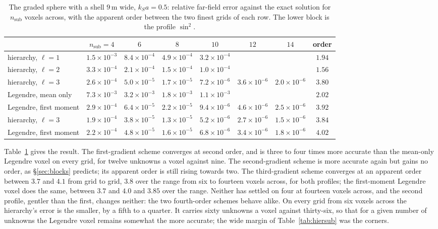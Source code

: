 \documentclass[11pt,a4paper]{article}
\begin{document}
\begin{table}[htbp]
\centering
\caption{The graded sphere with a shell $9$\,m wide, $k_Sa=0.5$: relative far-field error against the
exact solution for $n_{\mathrm{sub}}$ voxels across, with the apparent order between the two finest
grids of each row. The lower block is the profile $\sin^2$.}\label{tab:hiergraded}
\small\setlength{\tabcolsep}{4pt}
\begin{tabular}{@{}lccccccc@{}}
\toprule
 & $n_{\mathrm{sub}}=4$ & $6$ & $8$ & $10$ & $12$ & $14$ & order \\
\midrule
hierarchy, $\ell=1$ & $1.5\times10^{-3}$ & $8.4\times10^{-4}$ & $4.9\times10^{-4}$ & $3.2\times10^{-4}$ & & & $1.94$ \\
hierarchy, $\ell=2$ & $3.3\times10^{-4}$ & $2.1\times10^{-4}$ & $1.5\times10^{-4}$ & $1.0\times10^{-4}$ & & & $1.56$ \\
hierarchy, $\ell=3$ & $2.6\times10^{-4}$ & $5.0\times10^{-5}$ & $1.7\times10^{-5}$ & $7.2\times10^{-6}$ & $3.6\times10^{-6}$ & $2.0\times10^{-6}$ & $3.80$ \\
Legendre, mean only & $7.3\times10^{-3}$ & $3.2\times10^{-3}$ & $1.8\times10^{-3}$ & $1.1\times10^{-3}$ & & & $2.02$ \\
Legendre, first moment & $2.9\times10^{-4}$ & $6.4\times10^{-5}$ & $2.2\times10^{-5}$ & $9.4\times10^{-6}$ & $4.6\times10^{-6}$ & $2.5\times10^{-6}$ & $3.92$ \\
\midrule
hierarchy, $\ell=3$ & $1.9\times10^{-4}$ & $3.8\times10^{-5}$ & $1.3\times10^{-5}$ & $5.2\times10^{-6}$ & $2.7\times10^{-6}$ & $1.5\times10^{-6}$ & $3.84$ \\
Legendre, first moment & $2.2\times10^{-4}$ & $4.8\times10^{-5}$ & $1.6\times10^{-5}$ & $6.8\times10^{-6}$ & $3.4\times10^{-6}$ & $1.8\times10^{-6}$ & $4.02$ \\
\bottomrule
\end{tabular}
\end{table}

Table~\ref{tab:hiergraded} gives the result. The first-gradient scheme converges at second order, and
is three to four times more accurate than the mean-only Legendre voxel on every grid, for twelve
unknowns a voxel against nine. The second-gradient scheme is more accurate again but gains no order,
as \S\ref{sec:blocks} predicts; its apparent order is still rising towards two. The third-gradient
scheme converges at an apparent order between $3.7$ and $4.1$ from grid to grid, $3.8$ over the range
from six to fourteen voxels across, for both profiles; the first-moment Legendre voxel does the same,
between $3.7$ and $4.0$ and $3.85$ over the range. Neither has settled on four at fourteen voxels
across, and the second profile, gentler than the first, changes neither: the two fourth-order schemes
behave alike. On every grid from six voxels across the hierarchy's error is the smaller, by a fifth to
a quarter. It carries sixty unknowns a voxel against thirty-six, so that for a given number of unknowns
the Legendre voxel remains somewhat the more accurate; the wide margin of Table~\ref{tab:hiersub} was
the corners.
\end{document}
